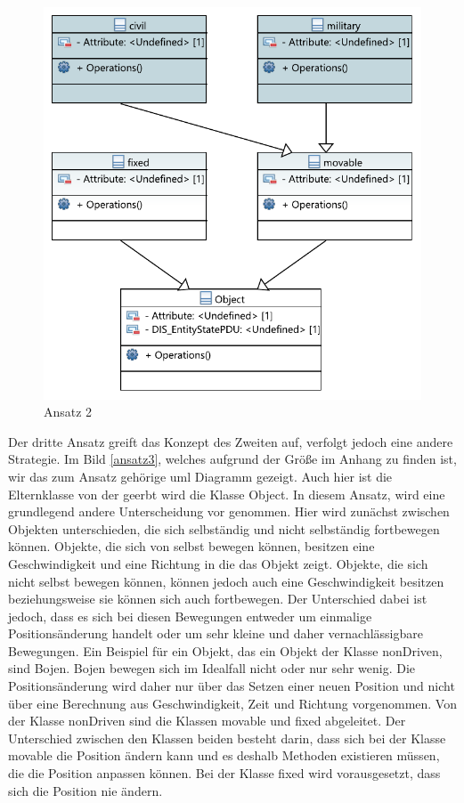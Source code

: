 \begin{figure}[H]
	\centering
	\includegraphics[scale=0.9]{bilder/pdfvorlagen/ansatz1}
	\caption[Ansatz 2]{Ansatz 2}
	\label{ansatz2}
\end{figure}
Der dritte Ansatz greift das Konzept des Zweiten auf, verfolgt jedoch eine andere Strategie. Im Bild \ref{ansatz3}, welches aufgrund der Größe im Anhang zu finden ist, wir das zum Ansatz gehörige \ac{uml} Diagramm gezeigt. Auch hier ist die Elternklasse von der geerbt wird die Klasse \glqq Object\grqq{}. In diesem Ansatz, wird eine grundlegend andere Unterscheidung vor genommen. Hier wird zunächst zwischen Objekten unterschieden, die sich selbständig und nicht selbständig fortbewegen können. Objekte, die sich von selbst bewegen können,  besitzen eine Geschwindigkeit und eine Richtung in die das Objekt zeigt. Objekte, die sich nicht selbst bewegen können, können jedoch auch eine Geschwindigkeit besitzen beziehungsweise sie können sich auch fortbewegen. Der Unterschied dabei ist jedoch, dass es sich bei diesen Bewegungen entweder um einmalige Positionsänderung handelt oder um sehr kleine und daher vernachlässigbare Bewegungen. Ein Beispiel für ein Objekt, das ein Objekt der Klasse \glqq nonDriven\grqq{}, sind Bojen. Bojen bewegen sich im Idealfall nicht oder nur sehr wenig. Die Positionsänderung wird daher nur über das Setzen einer neuen Position und nicht über eine Berechnung aus Geschwindigkeit, Zeit und Richtung vorgenommen. Von der Klasse  \glqq nonDriven\grqq{} sind die Klassen \glqq movable\grqq{} und   \glqq fixed\grqq{} abgeleitet. Der Unterschied zwischen den Klassen beiden besteht darin, dass sich bei der Klasse  \glqq movable\grqq{} die Position ändern kann und es deshalb Methoden existieren müssen, die die Position anpassen können. Bei der Klasse \glqq fixed\grqq{} wird vorausgesetzt, dass sich die Position nie ändern.\\
